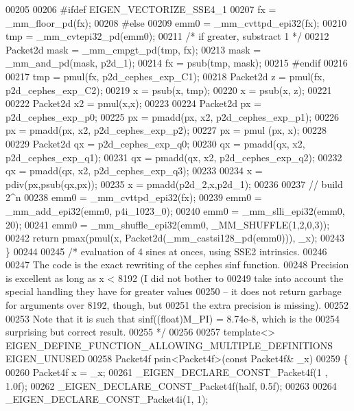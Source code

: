 \begin{DoxyCode}
00205 
00206 \textcolor{preprocessor}{#ifdef EIGEN\_VECTORIZE\_SSE4\_1}
00207   fx = \_mm\_floor\_pd(fx);
00208 \textcolor{preprocessor}{#else}
00209   emm0 = \_mm\_cvttpd\_epi32(fx);
00210   tmp  = \_mm\_cvtepi32\_pd(emm0);
00211   \textcolor{comment}{/* if greater, substract 1 */}
00212   Packet2d mask = \_mm\_cmpgt\_pd(tmp, fx);
00213   mask = \_mm\_and\_pd(mask, p2d\_1);
00214   fx = psub(tmp, mask);
00215 \textcolor{preprocessor}{#endif}
00216 
00217   tmp = pmul(fx, p2d\_cephes\_exp\_C1);
00218   Packet2d z = pmul(fx, p2d\_cephes\_exp\_C2);
00219   x = psub(x, tmp);
00220   x = psub(x, z);
00221 
00222   Packet2d x2 = pmul(x,x);
00223 
00224   Packet2d px = p2d\_cephes\_exp\_p0;
00225   px = pmadd(px, x2, p2d\_cephes\_exp\_p1);
00226   px = pmadd(px, x2, p2d\_cephes\_exp\_p2);
00227   px = pmul (px, x);
00228 
00229   Packet2d qx = p2d\_cephes\_exp\_q0;
00230   qx = pmadd(qx, x2, p2d\_cephes\_exp\_q1);
00231   qx = pmadd(qx, x2, p2d\_cephes\_exp\_q2);
00232   qx = pmadd(qx, x2, p2d\_cephes\_exp\_q3);
00233 
00234   x = pdiv(px,psub(qx,px));
00235   x = pmadd(p2d\_2,x,p2d\_1);
00236 
00237   \textcolor{comment}{// build 2^n}
00238   emm0 = \_mm\_cvttpd\_epi32(fx);
00239   emm0 = \_mm\_add\_epi32(emm0, p4i\_1023\_0);
00240   emm0 = \_mm\_slli\_epi32(emm0, 20);
00241   emm0 = \_mm\_shuffle\_epi32(emm0, \_MM\_SHUFFLE(1,2,0,3));
00242   \textcolor{keywordflow}{return} pmax(pmul(x, Packet2d(\_mm\_castsi128\_pd(emm0))), \_x);
00243 \}
00244 
00245 \textcolor{comment}{/* evaluation of 4 sines at onces, using SSE2 intrinsics.}
00246 \textcolor{comment}{}
00247 \textcolor{comment}{   The code is the exact rewriting of the cephes sinf function.}
00248 \textcolor{comment}{   Precision is excellent as long as x < 8192 (I did not bother to}
00249 \textcolor{comment}{   take into account the special handling they have for greater values}
00250 \textcolor{comment}{   -- it does not return garbage for arguments over 8192, though, but}
00251 \textcolor{comment}{   the extra precision is missing).}
00252 \textcolor{comment}{}
00253 \textcolor{comment}{   Note that it is such that sinf((float)M\_PI) = 8.74e-8, which is the}
00254 \textcolor{comment}{   surprising but correct result.}
00255 \textcolor{comment}{*/}
00256 
00257 \textcolor{keyword}{template}<> EIGEN\_DEFINE\_FUNCTION\_ALLOWING\_MULTIPLE\_DEFINITIONS EIGEN\_UNUSED
00258 Packet4f psin<Packet4f>(\textcolor{keyword}{const} Packet4f& \_x)
00259 \{
00260   Packet4f x = \_x;
00261   \_EIGEN\_DECLARE\_CONST\_Packet4f(1 , 1.0f);
00262   \_EIGEN\_DECLARE\_CONST\_Packet4f(half, 0.5f);
00263 
00264   \_EIGEN\_DECLARE\_CONST\_Packet4i(1, 1);

\end{DoxyCode}

